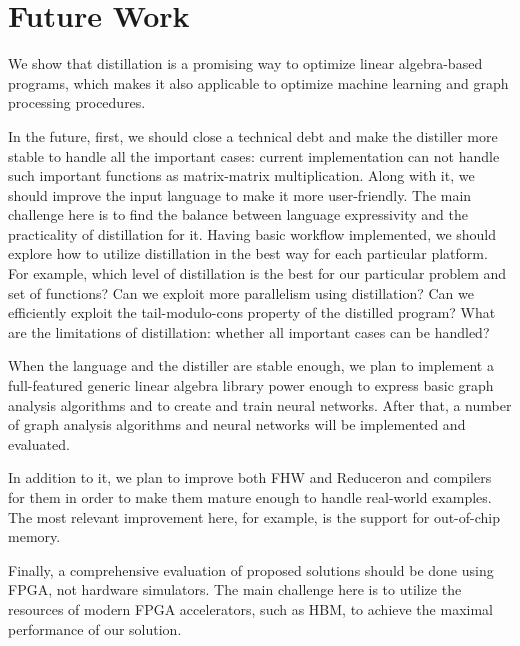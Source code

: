 \section{Future Work}

We show that distillation is a promising way to optimize linear algebra-based programs, which makes it also applicable to optimize machine learning and graph processing procedures.

In the future, first, we should close a technical debt and make the distiller more stable to handle all the important cases: current implementation can not handle such important functions as matrix-matrix multiplication.
Along with it, we should improve the input language to make it more user-friendly.
The main challenge here is to find the balance between language expressivity and the practicality of distillation for it.
Having basic workflow implemented, we should explore how to utilize distillation in the best way for each particular platform. 
For example, which level of distillation is the best for our particular problem and set of functions?
Can we exploit more parallelism using distillation?
Can we efficiently exploit the tail-modulo-cons property of the distilled program?
What are the limitations of distillation: whether all important cases can be handled?

When the language and the distiller are stable enough, we plan to implement a full-featured generic linear algebra library power enough to express basic graph analysis algorithms and to create and train neural networks.
After that, a number of graph analysis algorithms and neural networks will be implemented and evaluated.

In addition to it, we plan to improve both FHW and Reduceron and compilers for them in order to make them mature enough to handle real-world examples.
The most relevant improvement here, for example, is the support for out-of-chip memory.

Finally, a comprehensive evaluation of proposed solutions should be done using FPGA, not hardware simulators. The main challenge here is to utilize the resources of modern FPGA accelerators, such as HBM, to achieve the maximal performance of our solution.